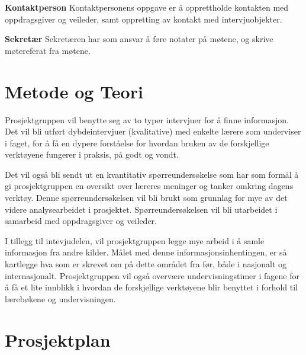 \documentclass[norsk,a4paper,12pt]{article}
\begin{document}
\noindent\textbf{Kontaktperson}\newline
Kontaktpersonens oppgave er å opprettholde kontakten med oppdragsgiver og veileder, samt oppretting av  kontakt med intervjuobjekter.
\newline

\noindent\textbf{Sekretær}\newline
Sekretæren har som ansvar å føre notater på møtene, og skrive møtereferat fra møtene.


\section{Metode og Teori}

Prosjektgruppen vil benytte seg av to typer intervjuer for å finne informasjon. 
Det vil bli utført dybdeintervjuer (kvalitative) med enkelte lærere som underviser i faget, for å få en dypere forståelse for hvordan bruken av de forskjellige verktøyene fungerer i praksis, på godt og vondt.

Det vil også bli sendt ut en kvantitativ spørreundersøkelse som har som formål å gi prosjektgruppen en oversikt over læreres meninger og tanker omkring dagens verktøy. Denne spørreundersøkelsen vil bli brukt som grunnlag for mye av det videre analysearbeidet i prosjektet. Spørreundersøkelsen vil bli utarbeidet i samarbeid med oppdragsgiver og veileder.

I tillegg til intevjudelen, vil prosjektgruppen legge mye arbeid i å samle informasjon fra andre kilder. Målet med denne informasjonsinhentingen, er så kartlegge hva som er skrevet om på dette området fra før, både i nasjonalt og internasjonalt. Prosjektgruppen vil også overvære undervisningstimer i fagene for å få et lite innblikk i hvordan de forskjellige verktøyene blir benyttet i forhold til lærebøkene og undervisningen. 





\newpage

\section{Prosjektplan}
\end{document}
